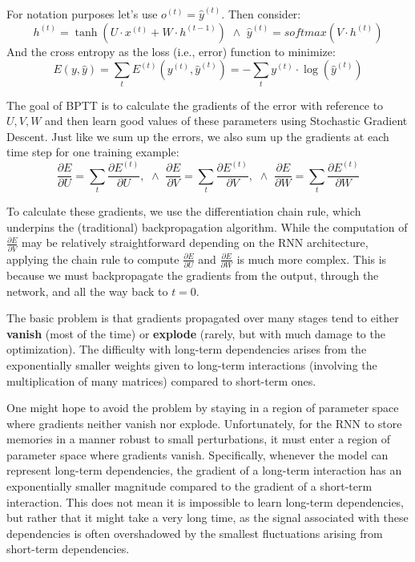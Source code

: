 For notation purposes let's use $o^{(t)} =  \hat{y}^{(t)}$. Then consider:
\begin{equation}
    h^{(t)} = \tanh (U \cdot x^{(t)} + W \cdot h^{(t - 1)}) \,\, \land \,\, \hat{y}^{(t)} = softmax(V \cdot h^{(t)})
\end{equation}
And the cross entropy as the loss (i.e., error) function to minimize:
\begin{equation}
    E(y, \hat{y}) = \sum_t E^{(t)}(y^{(t)}, \hat{y}^{(t)}) = - \sum_t y^{(t)} \cdot \log(\hat{y}^{(t)})
\end{equation}

The goal of BPTT is to calculate the gradients of the error with reference to
$U, V, W$ and then learn good values of these parameters using Stochastic Gradient
Descent. Just like we sum up the errors, we also sum up the gradients at each
time step for one training example:
\begin{equation}
    \frac{\partial E}{\partial U} = \sum_t \frac{\partial E^{(t)}}{\partial U}, \,\, \land \,\,
    \frac{\partial E}{\partial V} = \sum_t \frac{\partial E^{(t)}}{\partial V}, \,\, \land \,\,
    \frac{\partial E}{\partial W} = \sum_t \frac{\partial E^{(t)}}{\partial W}
\end{equation}

To calculate these gradients, we use the differentiation chain rule, which
underpins the (traditional) backpropagation algorithm. While the computation of
$\frac{\partial E}{\partial V}$ may be relatively straightforward depending on
the RNN architecture, applying the chain rule to compute $\frac{\partial E}{\partial U}$
and $\frac{\partial E}{\partial W}$ is much more complex. This is because we must
backpropagate the gradients from the output, through the network, and all the way
back to $t = 0$.

The basic problem is that gradients propagated over many stages tend to either
\textbf{vanish} (most of the time) or \textbf{explode} (rarely, but with much
damage to the optimization). The difficulty with long-term dependencies arises
from the exponentially smaller weights given to long-term interactions (involving
the multiplication of many matrices) compared to short-term ones.

One might hope to avoid the problem by staying in a region of parameter space where
gradients neither vanish nor explode. Unfortunately, for the RNN to store memories
in a manner robust to small perturbations, it must enter a region of parameter
space where gradients vanish. Specifically, whenever the model can represent
long-term dependencies, the gradient of a long-term interaction has an exponentially
smaller magnitude compared to the gradient of a short-term interaction. This does
not mean it is impossible to learn long-term dependencies, but rather that it
might take a very long time, as the signal associated with these dependencies is
often overshadowed by the smallest fluctuations arising from short-term dependencies.

